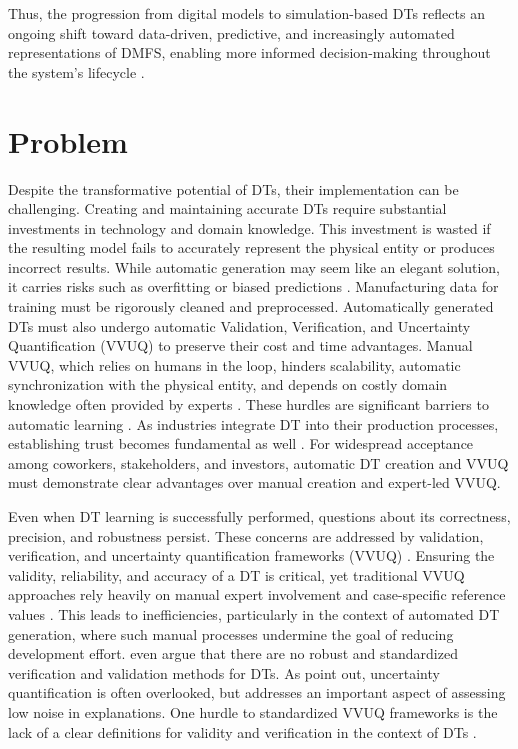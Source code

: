 Thus, the progression from digital models to simulation-based DTs reflects an ongoing shift toward data-driven, predictive, and increasingly automated representations of DMFS, enabling more informed decision-making throughout the system's lifecycle \autocite{boschert2016digital,lim2020state}.

\section{Problem}
\label{sec:problem}
Despite the transformative potential of DTs, their implementation can be challenging. Creating and maintaining accurate DTs require substantial investments in technology and domain knowledge. This investment is wasted if the resulting model fails to accurately represent the physical entity or produces incorrect results. While automatic generation may seem like an elegant solution, it carries risks such as overfitting or biased predictions \autocite{gemanbias}. Manufacturing data for training must be rigorously cleaned and preprocessed. Automatically generated DTs must also undergo automatic Validation, Verification, and Uncertainty Quantification (VVUQ) to preserve their cost and time advantages. Manual VVUQ, which relies on humans in the loop, hinders scalability, automatic synchronization with the physical entity, and depends on costly domain knowledge often provided by experts \autocite{Bitencourt2023}. These hurdles are significant barriers to automatic learning \autocite{ribeiro2016should,zhao2024data}. As industries integrate DT into their production processes, establishing trust becomes fundamental as well \autocite{trauer2022digital,arrieta2020explainable}. For widespread acceptance among coworkers, stakeholders, and investors, automatic DT creation and VVUQ must demonstrate clear advantages over manual creation and expert-led VVUQ.

Even when DT learning is successfully performed, questions about its correctness, precision, and robustness persist. These concerns are addressed by validation, verification, and uncertainty quantification frameworks (VVUQ) \autocite{sel2025survey}. Ensuring the validity, reliability, and accuracy of a DT is critical, yet traditional VVUQ approaches rely heavily on manual expert involvement and case-specific reference values \autocite{Bitencourt2023,hua2022validation}. This leads to inefficiencies, particularly in the context of automated DT generation, where such manual processes undermine the goal of reducing development effort. \citeauthor{hua2022validation} even argue that there are no robust and standardized verification and validation methods for DTs. As \autocite{sel2025survey} point out, uncertainty quantification is often overlooked, but addresses an important aspect of assessing low noise in explanations. One hurdle to standardized VVUQ frameworks is the lack of a clear definitions for validity and verification in the context of DTs \autocite{Bitencourt2023}.

